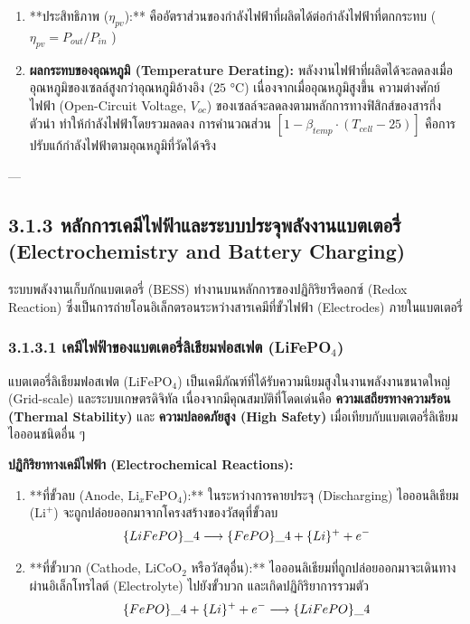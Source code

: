 \documentclass[11pt,a4paper,openany]{report}
\begin{document}
\begin{enumerate}
  \item **ประสิทธิภาพ ($\eta_{pv}$):** คืออัตราส่วนของกำลังไฟฟ้าที่ผลิตได้ต่อกำลังไฟฟ้าที่ตกกระทบ ($\eta_{pv} = P_{out} / P_{in}$ )
  \item \textbf{ผลกระทบของอุณหภูมิ (Temperature Derating):} พลังงานไฟฟ้าที่ผลิตได้จะลดลงเมื่ออุณหภูมิของเซลล์สูงกว่าอุณหภูมิอ้างอิง ($25 \text{ °C}$) เนื่องจากเมื่ออุณหภูมิสูงขึ้น ความต่างศักย์ไฟฟ้า (Open-Circuit Voltage, $V_{oc}$) ของเซลล์จะลดลงตามหลักการทางฟิสิกส์ของสารกึ่งตัวนำ ทำให้กำลังไฟฟ้าโดยรวมลดลง การคำนวณส่วน $[1 - \beta_{temp} \cdot (T_{cell} - 25)]$ คือการปรับแก้กำลังไฟฟ้าตามอุณหภูมิที่วัดได้จริง
\end{enumerate}


---

\subsection{3.1.3 หลักการเคมีไฟฟ้าและระบบประจุพลังงานแบตเตอรี่ (Electrochemistry and Battery Charging)}


ระบบพลังงานเก็บกักแบตเตอรี่ (BESS) ทำงานบนหลักการของปฏิกิริยารีดอกซ์ (Redox Reaction) ซึ่งเป็นการถ่ายโอนอิเล็กตรอนระหว่างสารเคมีที่ขั้วไฟฟ้า (Electrodes) ภายในแบตเตอรี่

\subsubsection{3.1.3.1 เคมีไฟฟ้าของแบตเตอรี่ลิเธียมฟอสเฟต (LiFePO$_4$)}


แบตเตอรี่ลิเธียมฟอสเฟต ($\text{LiFePO}_4$) เป็นเคมีภัณฑ์ที่ได้รับความนิยมสูงในงานพลังงานขนาดใหญ่ (Grid-scale) และระบบเกษตรดิจิทัล เนื่องจากมีคุณสมบัติที่โดดเด่นคือ \textbf{ความเสถียรทางความร้อน (Thermal Stability)} และ \textbf{ความปลอดภัยสูง (High Safety)} เมื่อเทียบกับแบตเตอรี่ลิเธียมไอออนชนิดอื่น ๆ

\textbf{ปฏิกิริยาทางเคมีไฟฟ้า (Electrochemical Reactions):}

\begin{enumerate}
  \item **ที่ขั้วลบ (Anode, $\text{Li}_x\text{FePO}_4$):** ในระหว่างการคายประจุ (Discharging) ไอออนลิเธียม ($\text{Li}^+$) จะถูกปล่อยออกมาจากโครงสร้างของวัสดุที่ขั้วลบ
  $$\text\{LiFePO\}\_4 \longrightarrow \text\{FePO\}\_4 + \text\{Li\}^+ + e^-$$
  \item **ที่ขั้วบวก (Cathode, $\text{LiCoO}_2$ หรือวัสดุอื่น):** ไอออนลิเธียมที่ถูกปล่อยออกมาจะเดินทางผ่านอิเล็กโทรไลต์ (Electrolyte) ไปยังขั้วบวก และเกิดปฏิกิริยาการรวมตัว
  $$\text\{FePO\}\_4 + \text\{Li\}^+ + e^- \longrightarrow \text\{LiFePO\}\_4$$
\end{enumerate}
\end{document}
